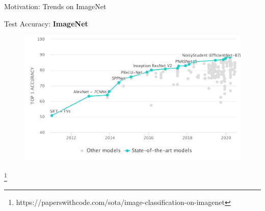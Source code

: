 \documentclass[mathserif,notheorems, hyperref={colorlinks, urlcolor=blue, linkcolor=blue}]{beamer}
\newcommand{\source}[1]{{\let\thefootnote\relax\footnote{{\tiny #1}}}}
\begin{document}
    \begin{frame}{Motivation: Trends on ImageNet} 
        \begin{center}
            \Large Test Accuracy: \textbf{ImageNet}
        \end{center}

        \begin{figure}[]
            \centering
            \includegraphics[width=\linewidth]{figures/ImageNet}
        \end{figure} 

        \source{https://paperswithcode.com/sota/image-classification-on-imagenet}
    \end{frame}
\end{document}
